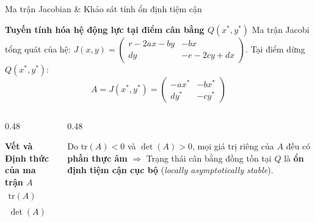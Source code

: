\documentclass[aspectratio=169, 10pt]{beamer}
\renewcommand{\implies}{\ensuremath{\Rightarrow}}
\begin{document}
\begin{frame}{Ma trận Jacobian \& Khảo sát tính ổn định tiệm cận}
  \begin{block}{\textbf{Tuyến tính hóa hệ động lực tại điểm cân bằng $Q(x^*, y^*)$}}
    \footnotesize
    Ma trận Jacobi tổng quát của hệ:
    $J(x, y) = \begin{pmatrix} r - 2ax - by & -bx \\ dy & -e - 2cy + dx \end{pmatrix}$.
    Tại điểm dừng $Q(x^*, y^*)$:
    \begin{equation}
    A = J(x^*, y^*) = \begin{pmatrix} -ax^* & -bx^* \\ dy^* & -cy^* \end{pmatrix}
    \end{equation}
  \end{block}

  \vspace{0.1cm}

  \begin{columns}[c]
    \begin{column}{0.48\textwidth}
      \begin{exampleblock}{\textbf{Vết và Định thức của ma trận $A$}}
        \footnotesize
        \begin{align}
        \mathrm{tr}(A) &= -(ax^* + cy^*) < 0 \\
        \det(A) &= (ac + bd)x^*y^* > 0
        \end{align}
      \end{exampleblock}
    \end{column}

    \begin{column}{0.48\textwidth}
      \begin{tcolorbox}[colback=OceanLight, colframe=OceanTeal, arc=2mm, title=\textbf{Tiêu chuẩn Routh--Hurwitz}]
        \footnotesize
        Do $\mathrm{tr}(A) < 0$ và $\det(A) > 0$, mọi giá trị riêng của $A$ đều có \textbf{phần thực âm} $\implies$ Trạng thái cân bằng đồng tồn tại $Q$ là \textbf{ổn định tiệm cận cục bộ} (\textit{locally asymptotically stable}).
      \end{tcolorbox}
    \end{column}
  \end{columns}
\end{frame}
\end{document}
